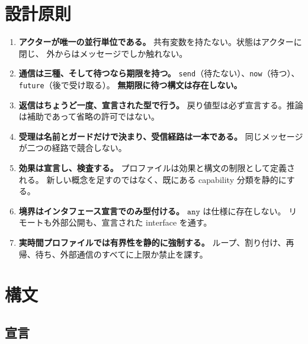 \documentclass[11pt,a4paper]{ltjsarticle}
\theoremstyle{remark}
\newcommand{\ty}[1]{\ensuremath{\mathtt{#1}}}
\begin{document}
\section{設計原則}

\begin{enumerate}
\item[\textbf{P1}] \textbf{アクターが唯一の並行単位である。}
  共有変数を持たない。状態はアクターに閉じ、
  外からはメッセージでしか触れない。

\item[\textbf{P2}] \textbf{通信は三種、そして待つなら期限を持つ。}
  \texttt{send}（待たない）、\texttt{now}（待つ）、
  \texttt{future}（後で受け取る）。
  \textbf{無期限に待つ構文は存在しない。}

\item[\textbf{P3}] \textbf{返信はちょうど一度、宣言された型で行う。}
  戻り値型は必ず宣言する。推論は補助であって省略の許可ではない。

\item[\textbf{P4}] \textbf{受理は名前とガードだけで決まり、受信経路は一本である。}
  同じメッセージが二つの経路で競合しない。

\item[\textbf{P5}] \textbf{効果は宣言し、検査する。}
  プロファイルは効果と構文の制限として定義される。
  新しい概念を足すのではなく、既にある capability 分類を静的にする。

\item[\textbf{P6}] \textbf{境界はインタフェース宣言でのみ型付ける。}
  \ty{any} は仕様に存在しない。
  リモートも外部公開も、宣言された interface を通す。

\item[\textbf{P7}] \textbf{実時間プロファイルでは有界性を静的に強制する。}
  ループ、割り付け、再帰、待ち、外部通信のすべてに上限か禁止を課す。
\end{enumerate}

\section{構文}

\subsection{宣言}
\end{document}
